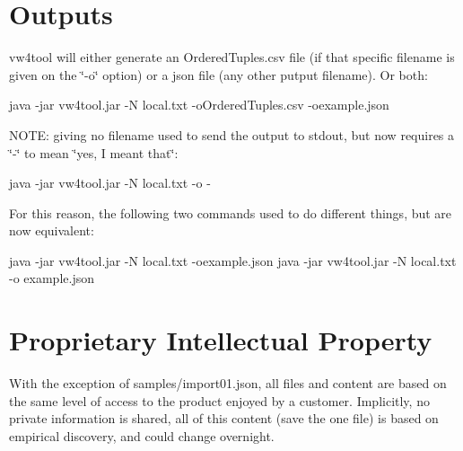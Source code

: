 \section*{Outputs }

vw4tool will either generate an Ordered\+Tuples.\+csv file (if that specific filename is given on the \char`\"{}-\/o\char`\"{} option) or a json file (any other putput filename). Or both\+: \begin{DoxyVerb}java -jar vw4tool.jar  -N local.txt -oOrderedTuples.csv -oexample.json
\end{DoxyVerb}


N\+O\+T\+E\+: giving no filename used to send the output to stdout, but now requires a \char`\"{}-\/\char`\"{} to mean \char`\"{}yes, I meant that\char`\"{}\+: \begin{DoxyVerb}java -jar vw4tool.jar  -N local.txt -o -
\end{DoxyVerb}


For this reason, the following two commands used to do different things, but are now equivalent\+: \begin{DoxyVerb}java -jar vw4tool.jar  -N local.txt -oexample.json
java -jar vw4tool.jar  -N local.txt -o example.json
\end{DoxyVerb}


\section*{Proprietary Intellectual Property }

With the exception of samples/import01.\+json, all files and content are based on the same level of access to the product enjoyed by a customer. Implicitly, no private information is shared, all of this content (save the one file) is based on empirical discovery, and could change overnight. 